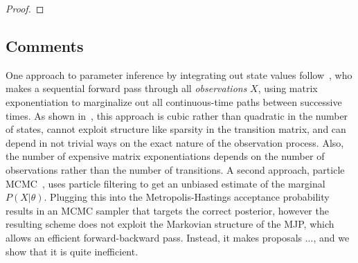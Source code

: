 \begin{proof}
\end{proof}

\subsection{Comments}\label{sec:comments}
 One approach to parameter inference by integrating out state values follow~\citep{FearnSher2006}, who makes a sequential 
 forward pass through all {\em observations} $X$, using matrix exponentiation
 to marginalize out all
 continuous-time paths between successive times. As
 shown in~\cite{RaoTeh13}, this approach is cubic rather than 
 quadratic in the 
 number of states, cannot exploit structure like sparsity in the 
 transition matrix, and can depend in not trivial ways on the exact 
 nature of the observation process.
 Also, the number of expensive matrix exponentiations depends on
 the number of observations rather than the number of transitions.
 A second approach, particle MCMC~\citep{Andrieu10}, uses 
 particle filtering to get an unbiased estimate of the marginal 
 $P(X|\theta)$. Plugging this into the Metropolis-Hastings 
 acceptance probability results in an MCMC sampler that targets the 
 correct posterior, however %
 the resulting scheme does not exploit the Markovian structure of the MJP, which allows an efficient forward-backward pass. Instead, it makes proposals ..., and we show that it is quite inefficient.

